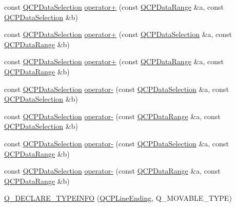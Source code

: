\begin{DoxyCompactItemize}
\item 
const \hyperlink{class_q_c_p_data_selection}{Q\+C\+P\+Data\+Selection} \hyperlink{qcustomplot_8hh_a5feed9419bd3df5cb4d4a761580545cc}{operator+} (const \hyperlink{class_q_c_p_data_range}{Q\+C\+P\+Data\+Range} \&a, const \hyperlink{class_q_c_p_data_selection}{Q\+C\+P\+Data\+Selection} \&b)
\item 
const \hyperlink{class_q_c_p_data_selection}{Q\+C\+P\+Data\+Selection} \hyperlink{qcustomplot_8hh_aa574f51a74d6998e9be95e252e6be287}{operator+} (const \hyperlink{class_q_c_p_data_selection}{Q\+C\+P\+Data\+Selection} \&a, const \hyperlink{class_q_c_p_data_range}{Q\+C\+P\+Data\+Range} \&b)
\item 
const \hyperlink{class_q_c_p_data_selection}{Q\+C\+P\+Data\+Selection} \hyperlink{qcustomplot_8hh_a0822e3133b80b5dedfc8050a19c1e0c5}{operator+} (const \hyperlink{class_q_c_p_data_range}{Q\+C\+P\+Data\+Range} \&a, const \hyperlink{class_q_c_p_data_range}{Q\+C\+P\+Data\+Range} \&b)
\item 
const \hyperlink{class_q_c_p_data_selection}{Q\+C\+P\+Data\+Selection} \hyperlink{qcustomplot_8hh_a41147ef7d6303c746e398278b7b624d1}{operator-\/} (const \hyperlink{class_q_c_p_data_selection}{Q\+C\+P\+Data\+Selection} \&a, const \hyperlink{class_q_c_p_data_selection}{Q\+C\+P\+Data\+Selection} \&b)
\item 
const \hyperlink{class_q_c_p_data_selection}{Q\+C\+P\+Data\+Selection} \hyperlink{qcustomplot_8hh_a726652cb9ed840e3025435cc2c266468}{operator-\/} (const \hyperlink{class_q_c_p_data_range}{Q\+C\+P\+Data\+Range} \&a, const \hyperlink{class_q_c_p_data_selection}{Q\+C\+P\+Data\+Selection} \&b)
\item 
const \hyperlink{class_q_c_p_data_selection}{Q\+C\+P\+Data\+Selection} \hyperlink{qcustomplot_8hh_a32c5784ac70946f09a09b2dd19816b78}{operator-\/} (const \hyperlink{class_q_c_p_data_selection}{Q\+C\+P\+Data\+Selection} \&a, const \hyperlink{class_q_c_p_data_range}{Q\+C\+P\+Data\+Range} \&b)
\item 
const \hyperlink{class_q_c_p_data_selection}{Q\+C\+P\+Data\+Selection} \hyperlink{qcustomplot_8hh_ad62dd67b505c1fa9c02d1aafabcb9acf}{operator-\/} (const \hyperlink{class_q_c_p_data_range}{Q\+C\+P\+Data\+Range} \&a, const \hyperlink{class_q_c_p_data_range}{Q\+C\+P\+Data\+Range} \&b)
\item 
\hyperlink{qcustomplot_8hh_a1376c7245cffa4c7a6b945a542473907}{Q\+\_\+\+D\+E\+C\+L\+A\+R\+E\+\_\+\+T\+Y\+P\+E\+I\+N\+FO} (\hyperlink{class_q_c_p_line_ending}{Q\+C\+P\+Line\+Ending}, Q\+\_\+\+M\+O\+V\+A\+B\+L\+E\+\_\+\+T\+Y\+PE)

\end{DoxyCompactItemize}
